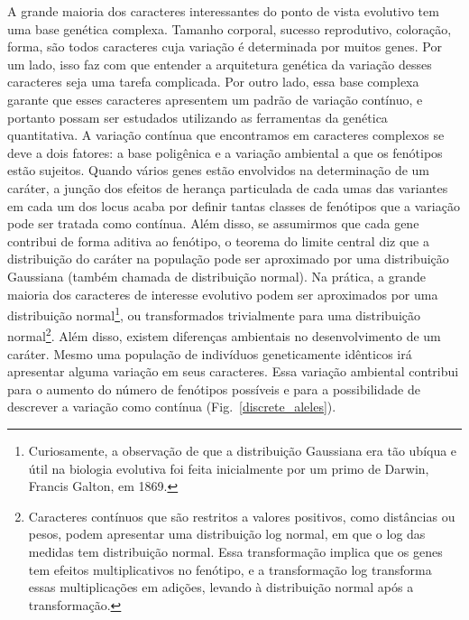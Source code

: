\begin{refsection}
A grande maioria dos caracteres interessantes do ponto de vista evolutivo tem
uma base genética complexa. Tamanho corporal, sucesso reprodutivo, coloração,
forma, são todos caracteres cuja variação é determinada por muitos genes. Por
um lado, isso faz com que entender a arquitetura genética da variação desses
caracteres seja uma tarefa complicada. Por outro lado, essa base complexa
garante que esses caracteres apresentem um padrão de variação contínuo, e
portanto possam ser estudados utilizando as ferramentas da genética
quantitativa. A variação contínua que encontramos em caracteres complexos se
deve a dois fatores: a base poligênica e a variação ambiental a que os
fenótipos estão sujeitos. Quando vários genes estão envolvidos na determinação
de um caráter, a junção dos efeitos de herança particulada de cada umas das
variantes em cada um dos locus acaba por definir tantas classes de fenótipos
que a variação pode ser tratada como contínua. Além disso, se assumirmos que
cada gene contribui de forma aditiva ao fenótipo, o teorema do limite central
diz que a distribuição do caráter na população pode ser aproximado por uma
distribuição Gaussiana (também chamada de distribuição normal). Na prática, a
grande maioria dos caracteres de interesse evolutivo podem ser aproximados por
uma distribuição normal\footnote{Curiosamente, a observação de que a
distribuição Gaussiana era tão ubíqua e útil na biologia evolutiva foi feita
inicialmente por um primo de Darwin, Francis Galton, em 1869.}, ou
transformados trivialmente para uma distribuição normal\footnote{Caracteres
contínuos que são restritos a valores positivos, como distâncias ou pesos,
podem apresentar uma distribuição log normal, em que o log das medidas tem
distribuição normal. Essa transformação implica que os genes tem efeitos
multiplicativos no fenótipo, e a transformação log transforma essas
multiplicações em adições, levando à distribuição normal após a
transformação.}. Além disso, existem diferenças ambientais no desenvolvimento
de um caráter. Mesmo uma população de indivíduos geneticamente idênticos irá
apresentar alguma variação em seus caracteres. Essa variação ambiental
contribui para o aumento do número de fenótipos possíveis e para a
possibilidade de descrever a variação como contínua
(Fig.~\ref{discrete_aleles}).


\end{refsection}
